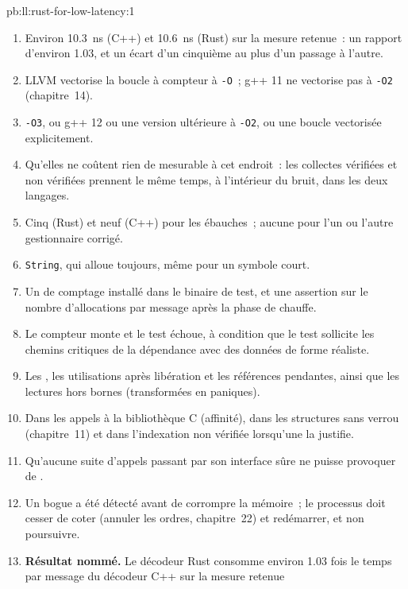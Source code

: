 \begin{solution}{pb:ll:rust-for-low-latency:1}
\begin{enumerate}
\item Environ \qty{10.3}{\nano\second} (C++) et \qty{10.6}{\nano\second} (Rust) sur la mesure retenue~: un rapport d'environ
1.03, et un écart d'un cinquième au plus d'un passage à l'autre.
\item LLVM vectorise la boucle à compteur à \texttt{-O}~; g++ 11 ne vectorise pas à \texttt{-O2} (chapitre~14).
\item \texttt{-O3}, ou g++ 12 ou une version ultérieure à \texttt{-O2}, ou une boucle vectorisée explicitement.
\item Qu'elles ne coûtent rien de mesurable à cet endroit~: les collectes vérifiées et non vérifiées prennent le même temps,
à l'intérieur du bruit, dans les deux langages.
\item Cinq (Rust) et neuf (C++) pour les ébauches~; aucune pour l'un ou l'autre gestionnaire corrigé.
\item \texttt{String}, qui alloue toujours, même pour un symbole court.
\item Un  de comptage installé dans le binaire de test, et une assertion sur le nombre d'allocations par message après la phase de chauffe.
\item Le compteur monte et le test échoue, à condition que le test sollicite les chemins critiques de la dépendance avec des données de forme réaliste.
\item Les , les utilisations après libération et les références pendantes, ainsi que les lectures hors bornes (transformées en paniques).
\item Dans les appels à la bibliothèque C (affinité), dans les structures sans verrou (chapitre~11) et dans l'indexation non vérifiée
lorsqu'une  la justifie.
\item Qu'aucune suite d'appels passant par son interface sûre ne puisse provoquer de .
\item Un bogue a été détecté avant de corrompre la mémoire~; le processus doit cesser de coter (annuler les ordres, chapitre~22) et
redémarrer, et non poursuivre.
\item \textbf{Résultat nommé.} Le décodeur Rust consomme environ 1.03 fois le temps par message du décodeur C++ sur la mesure retenue

\end{enumerate}
\end{solution}

